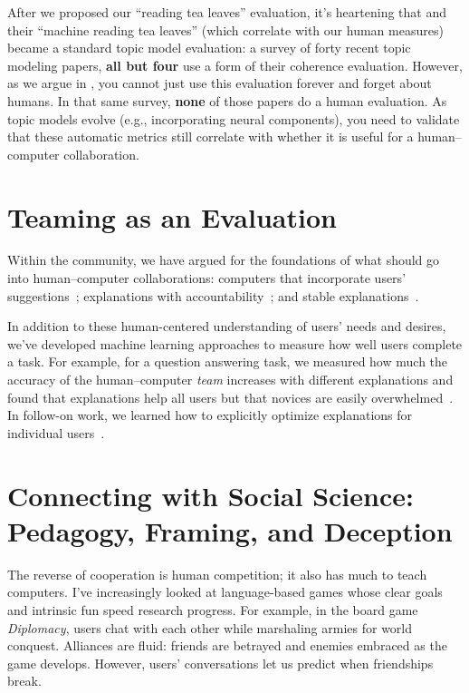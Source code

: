 After we proposed our ``reading tea leaves'' evaluation, it's
heartening that  and their ``machine reading tea
leaves'' (which correlate with our human measures) became a standard
topic model evaluation: a survey of forty recent topic modeling
papers, {\bf all but four} use a form of their coherence evaluation.
%
However, as we argue in , you cannot just use this
evaluation forever and forget about humans.
%
In that same survey, {\bf none} of those papers do a human evaluation.
%
As topic models evolve (e.g., incorporating
neural components), you need to validate that these automatic metrics
still correlate with whether it is useful for a human--computer
collaboration.

\section{Teaming as an Evaluation}

Within the  community, we have argued for the foundations of
what should go into human--computer collaborations: computers that incorporate
users' suggestions~\cite{kumar-19}; explanations with
accountability~\cite{smith-20}; and stable
explanations~\cite{smith-20:adherence}.

In addition to these human-centered understanding of users' needs and
desires, we've developed machine learning approaches to measure how
well users complete a task.
%
For example, for a question answering task, we measured how much the
accuracy of the human--computer \emph{team} increases with different
explanations and found that explanations help all users but that
novices are easily overwhelmed~\cite{feng-19}.
%
In follow-on work, we learned how to explicitly optimize explanations
for individual users~\cite{feng-22}.


\section{Connecting with Social Science: Pedagogy, Framing, and Deception}

The reverse of cooperation is human competition; it also has much to
teach computers.
%
I've increasingly looked at language-based games whose clear goals and
intrinsic fun speed research progress.
%
For example, in the board game \emph{Diplomacy}, users
chat with each other while marshaling armies for world conquest. Alliances are
fluid: friends are betrayed and enemies embraced as the game develops.
%
However,
users' conversations let us predict when friendships break.

